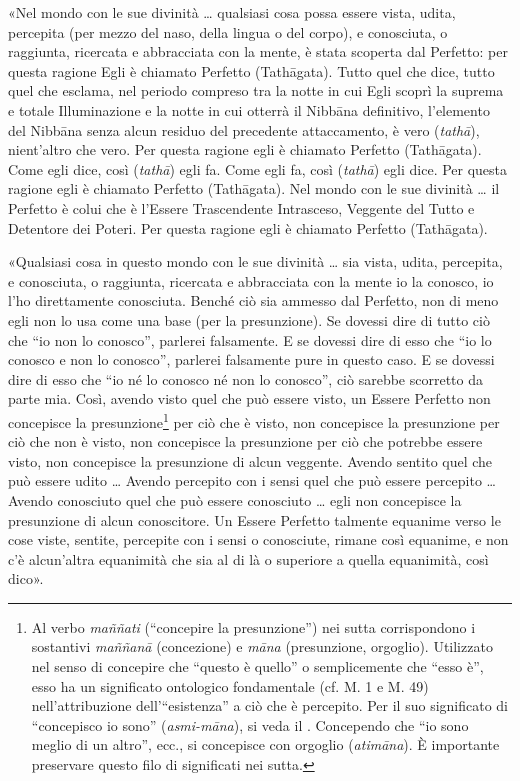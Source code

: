 
«Nel mondo con le sue divinità … qualsiasi cosa possa essere vista, udita,
percepita (per mezzo del naso, della lingua o del corpo), e conosciuta, o
raggiunta, ricercata e abbracciata con la mente, è stata scoperta dal Perfetto:
per questa ragione Egli è chiamato Perfetto (Tathāgata). Tutto quel che dice,
tutto quel che esclama, nel periodo compreso tra la notte in cui Egli scoprì la
suprema e totale Illuminazione e la notte in cui otterrà il Nibbāna definitivo,
l’elemento del Nibbāna senza alcun residuo del precedente attaccamento, è vero
(\emph{tathā}), nient’altro che vero. Per questa ragione egli è chiamato
Perfetto (Tathāgata). Come egli dice, così (\emph{tathā}) egli fa. Come egli fa,
così (\emph{tathā}) egli dice. Per questa ragione egli è chiamato Perfetto
(Tathāgata). Nel mondo con le sue divinità … il Perfetto è colui che è l’Essere
Trascendente Intrasceso, Veggente del Tutto e Detentore dei Poteri. Per questa
ragione egli è chiamato Perfetto (Tathāgata).


«Qualsiasi cosa in questo mondo con le sue divinità … sia vista, udita,
percepita, e conosciuta, o raggiunta, ricercata e abbracciata con la mente io la
conosco, io l’ho direttamente conosciuta. Benché ciò sia ammesso dal Perfetto,
non di meno egli non lo usa come una base (per la presunzione). Se dovessi dire
di tutto ciò che “io non lo conosco”, parlerei falsamente. E se dovessi dire di
esso che “io lo conosco e non lo conosco”, parlerei falsamente pure in questo
caso. E se dovessi dire di esso che “io né lo conosco né non lo conosco”, ciò
sarebbe scorretto da parte mia. Così, avendo visto quel che può essere visto, un
Essere Perfetto non concepisce la presunzione\footnote{Al verbo \emph{maññati}
  (“concepire la presunzione”) nei sutta corrispondono i sostantivi
  \emph{maññanā} (concezione) e \emph{māna} (presunzione, orgoglio). Utilizzato
  nel senso di concepire che “questo è quello” o semplicemente che “esso è”,
  esso ha un significato ontologico fondamentale (cf. M. 1 e M. 49)
  nell’attribuzione dell’“esistenza” a ciò che è percepito. Per il suo
  significato di “concepisco io sono” (\emph{asmi-māna}), si veda il
  \hyperlink{cap-12-La-Dottrina#pag259}{}. Concependo che “io sono meglio di un
  altro”, ecc., si concepisce con orgoglio (\emph{atimāna}). È importante
  preservare questo filo di significati nei sutta.} per ciò che è visto, non
concepisce la presunzione per ciò che non è visto, non concepisce la presunzione
per ciò che potrebbe essere visto, non concepisce la presunzione di alcun
veggente. Avendo sentito quel che può essere udito … Avendo percepito con i
sensi quel che può essere percepito … Avendo conosciuto quel che può essere
conosciuto … egli non concepisce la presunzione di alcun conoscitore. Un Essere
Perfetto talmente equanime verso le cose viste, sentite, percepite con i sensi o
conosciute, rimane così equanime, e non c’è alcun’altra equanimità che sia al di
là o superiore a quella equanimità, così dico».

